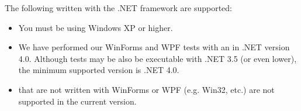 The  following \gdauts{} written with the .NET framework are supported:

\begin{itemize}
\item You must be using Windows XP or higher.
\item We have performed our WinForms and WPF tests with an  \gdaut{} in .NET version 4.0. Although tests may be also be executable with .NET 3.5 (or even lower), the minimum supported version is .NET 4.0.
\item \gdauts{} that are not written with WinForms or WPF (e.g. Win32, etc.) are not supported in the current version. 
\end{itemize}



